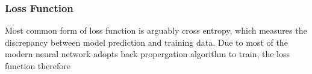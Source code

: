 \subsubsection{Loss Function}

Most common form of loss function is arguably cross entropy, which measures the discrepancy between model prediction and training data. Due to most of the modern neural network adopts back propergation algorithm to train, the loss function therefore 